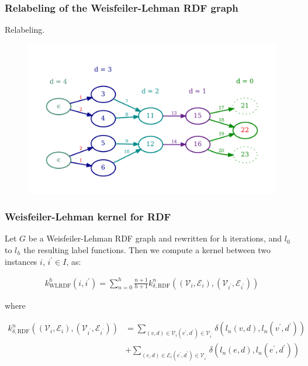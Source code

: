 \documentclass{beamer}
\begin{document}
\begingroup
\small
\begin{frame}
\frametitle{Relabeling of the Weisfeiler-Lehman RDF graph}

Relabeling.

\begin{center}
\begin{figure}
\includegraphics[width=\textwidth,keepaspectratio]{img/07-relabeled}
\end{figure}
\end{center}

\end{frame}
\endgroup


\begingroup
\small
\begin{frame}
\frametitle{Weisfeiler-Lehman kernel for RDF}

\begin{definition}
Let $G$ be a Weisfeiler-Lehman RDF graph and rewritten for h iterations, and $l_0$ to $l_h$ the resulting label functions. Then we compute a kernel between two instances $i$, $i^\prime \in I$, as:

\begin{align}
k_{\mathrm{WLRDF}}^{h}\left(i, i^{\prime}\right)=\sum_{n=0}^{h} \frac{n+1}{h+1} k_{\delta, \mathrm{RDF}}^{n}\left(\left(\mathcal{V}_{i}, \mathcal{E}_{i}\right),\left(\mathcal{V}_{i^{\prime}}, \mathcal{E}_{i^{\prime}}\right)\right)
\end{align}

where

\begin{align}
k_{\delta, \mathrm{RDF}}^{n}\left(\left(\mathcal{V}_{i}, \mathcal{E}_{i}\right),\left(\mathcal{V}_{i^{\prime}}, \mathcal{E}_{i^{\prime}}\right)\right) &=\sum_{(v, d) \in \mathcal{V}_{i}\left(v^{\prime}, d^{\prime}\right) \in \mathcal{V}_{i^{\prime}}} \delta\left(l_{n}(v, d), l_{n}\left(v^{\prime}, d^{\prime}\right)\right) \\
&+\sum_{(e, d) \in \mathcal{E}_{i}\left(c^{\prime}, d^{\prime}\right) \in \mathcal{V}_{i^{\prime}}} \delta\left(l_{n}(e, d), l_{n}\left(e^{\prime}, d^{\prime}\right)\right)
\end{align}

\end{definition}

\end{frame}
\endgroup
\end{document}
